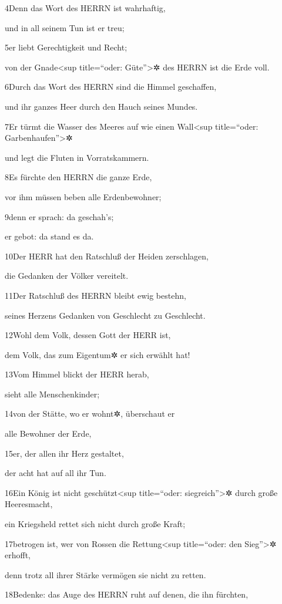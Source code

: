 4Denn das Wort des HERRN ist wahrhaftig,

und in all seinem Tun ist er treu;

5er liebt Gerechtigkeit und Recht;

von der Gnade\textless sup title=``oder: Güte''\textgreater✲ des HERRN
ist die Erde voll.

6Durch das Wort des HERRN sind die Himmel geschaffen,

und ihr ganzes Heer durch den Hauch seines Mundes.

7Er türmt die Wasser des Meeres auf wie einen Wall\textless sup
title=``oder: Garbenhaufen''\textgreater✲

und legt die Fluten in Vorratskammern.

8Es fürchte den HERRN die ganze Erde,

vor ihm müssen beben alle Erdenbewohner;

9denn er sprach: da geschah's;

er gebot: da stand es da.

10Der HERR hat den Ratschluß der Heiden zerschlagen,

die Gedanken der Völker vereitelt.

11Der Ratschluß des HERRN bleibt ewig bestehn,

seines Herzens Gedanken von Geschlecht zu Geschlecht.

12Wohl dem Volk, dessen Gott der HERR ist,

dem Volk, das zum Eigentum✲ er sich erwählt hat!

13Vom Himmel blickt der HERR herab,

sieht alle Menschenkinder;

14von der Stätte, wo er wohnt✲, überschaut er

alle Bewohner der Erde,

15er, der allen ihr Herz gestaltet,

der acht hat auf all ihr Tun.

16Ein König ist nicht geschützt\textless sup title=``oder:
siegreich''\textgreater✲ durch große Heeresmacht,

ein Kriegsheld rettet sich nicht durch große Kraft;

17betrogen ist, wer von Rossen die Rettung\textless sup title=``oder:
den Sieg''\textgreater✲ erhofft,

denn trotz all ihrer Stärke vermögen sie nicht zu retten.

18Bedenke: das Auge des HERRN ruht auf denen, die ihn fürchten,

